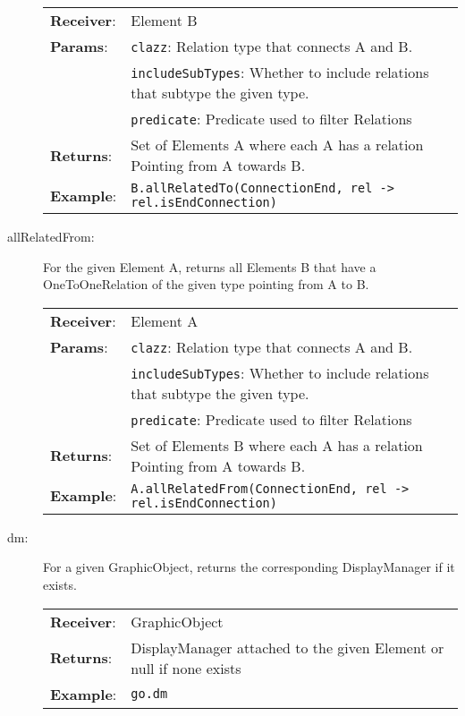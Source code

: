 \begin{description}
        \begin{tabularx}{\linewidth}{ l X }
          \textbf{Receiver}: & Element B
          \\
          \textbf{Params}:   & \texttt{clazz}: Relation type that connects A and B.
          \\
                             & \texttt{includeSubTypes}: Whether to include relations that subtype the given type.
          \\
                             & \texttt{predicate}: Predicate used to filter Relations
          \\
          \textbf{Returns}:  & Set of Elements A where each A has a relation Pointing from A towards B.
          \\
          \textbf{Example}:  & \texttt{B.allRelatedTo(ConnectionEnd, rel -> rel.isEndConnection)}
        \end{tabularx}

  \item[allRelatedFrom:] For the given Element A, returns all Elements B that have a OneToOneRelation of the given type pointing from A to B.

        \begin{tabularx}{\linewidth}{ l X }
          \textbf{Receiver}: & Element A
          \\
          \textbf{Params}:   & \texttt{clazz}: Relation type that connects A and B.
          \\
                             & \texttt{includeSubTypes}: Whether to include relations that subtype the given type.
          \\
                             & \texttt{predicate}: Predicate used to filter Relations
          \\
          \textbf{Returns}:  & Set of Elements B where each A has a relation Pointing from A towards B.
          \\
          \textbf{Example}:  & \texttt{A.allRelatedFrom(ConnectionEnd, rel -> rel.isEndConnection)}
        \end{tabularx}
  
  \item[dm:] For a given GraphicObject, returns the corresponding DisplayManager if it exists.
  \begin{tabularx}{\linewidth}{ l X }
    \textbf{Receiver}: & GraphicObject
    \\
    \textbf{Returns}:  & DisplayManager attached to the given Element or null if none exists
    \\
    \textbf{Example}:  & \texttt{go.dm}
  \end{tabularx}
\end{description}

